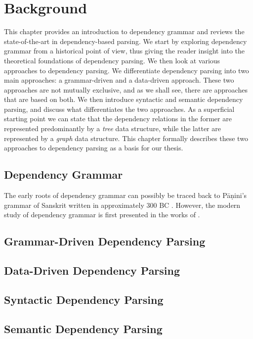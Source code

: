 \chapter{Background}
\label{chap:background}

This chapter provides an introduction to dependency grammar and reviews the state-of-the-art in
dependency-based parsing. We start by exploring dependency grammar from a historical point 
of view, thus giving the reader insight into the theoretical foundations of dependency parsing. 
We then look at various approaches to dependency parsing. We differentiate dependency 
parsing into two main approaches: a grammar-driven and a data-driven approach. 
These two approaches are not mutually exclusive, and as we shall see, there are approaches
that are based on both. We then introduce syntactic and semantic dependency
parsing, and discuss what differentiates the two approaches. As a superficial 
starting point we can state that the dependency relations in the former are represented 
predominantly by a \textit{tree} data structure, while the latter are represented 
by a \textit{graph} data structure. This chapter formally describes these two approaches
to dependency parsing as a basis for our thesis.

\section{Dependency Grammar}
The early roots of dependency grammar can possibly be traced back to P\={a}\d{n}ini's grammar
of Sanskrit written in approximately 300 BC \cite{Kruijff:02}. However, the modern study of 
dependency grammar is first presented in the works of .             

\section{Grammar-Driven Dependency Parsing}

\section{Data-Driven Dependency Parsing}

\section{Syntactic Dependency Parsing}

\section{Semantic Dependency Parsing}